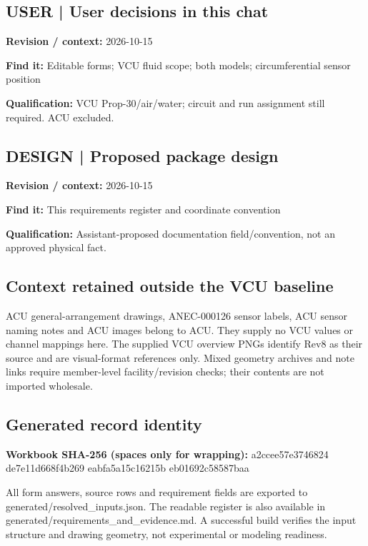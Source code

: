 \documentclass[11pt]{article}
\begin{document}
\par\noindent\begin{minipage}{\textwidth}\small
\subsection*{USER | User decisions in this chat}
\textbf{Revision / context:} 2026-10-15\par
\textbf{Find it:} Editable forms; VCU fluid scope; both models; circumferential sensor position\par
\textbf{Qualification:} VCU Prop-30/air/water; circuit and run assignment still required. ACU excluded.\par
\end{minipage}\par\vspace{5pt}
\par
\par\noindent\begin{minipage}{\textwidth}\small
\subsection*{DESIGN | Proposed package design}
\textbf{Revision / context:} 2026-10-15\par
\textbf{Find it:} This requirements register and coordinate convention\par
\textbf{Qualification:} Assistant-proposed documentation field/convention, not an approved physical fact.\par
\end{minipage}\par\vspace{5pt}
\subsection*{Context retained outside the VCU baseline}
ACU general-arrangement drawings, ANEC-000126 sensor labels, ACU sensor naming notes and ACU images belong to ACU. They supply no VCU values or channel mappings here. The supplied VCU overview PNGs identify Rev8 as their source and are visual-format references only. Mixed geometry archives and note links require member-level facility/revision checks; their contents are not imported wholesale.
\subsection*{Generated record identity}
\textbf{Workbook SHA-256 (spaces only for wrapping):} a2ccee57e3746824 de7e11d668f4b269 eabfa5a15c16215b eb01692c58587baa\par
All form answers, source rows and requirement fields are exported to generated/resolved\_inputs.json. The readable register is also available in generated/requirements\_and\_evidence.md. A successful build verifies the input structure and drawing geometry, not experimental or modeling readiness.
\end{document}
